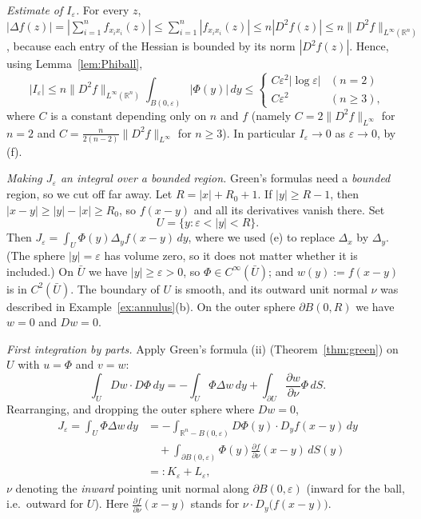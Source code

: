 \documentclass[11pt]{article}
\theoremstyle{plain}
\theoremstyle{definition}
\theoremstyle{remark}
\begin{document}
\textit{Estimate of $I_\varepsilon$.} For every $z$, $|\Delta f(z)| = \left|\sum_{i=1}^n f_{x_i x_i}(z)\right| \leq \sum_{i=1}^n |f_{x_i x_i}(z)| \leq n |D^2 f(z)| \leq n\|D^2 f\|_{L^\infty(\mathbb{R}^n)}$, because each entry of the Hessian is bounded by its norm $|D^2 f(z)|$. Hence, using Lemma~\ref{lem:Phiball},
\begin{equation}\label{eq:I}
|I_\varepsilon| \leq n\|D^2 f\|_{L^\infty(\mathbb{R}^n)} \int_{B(0,\varepsilon)} |\Phi(y)|\, dy \leq \begin{cases} C\varepsilon^2|\log\varepsilon| & (n=2) \\ C\varepsilon^2 & (n\geq 3), \end{cases}
\end{equation}
where $C$ is a constant depending only on $n$ and $f$ (namely $C = 2\|D^2f\|_{L^\infty}$ for $n = 2$ and $C = \frac{n}{2(n-2)}\|D^2 f\|_{L^\infty}$ for $n \geq 3$). In particular $I_\varepsilon \to 0$ as $\varepsilon \to 0$, by (f).

\textit{Making $J_\varepsilon$ an integral over a bounded region.} Green's formulas need a \emph{bounded} region, so we cut off far away. Let $R = |x| + R_0 + 1$. If $|y| \geq R - 1$, then $|x - y| \geq |y| - |x| \geq R_0$, so $f(x-y)$ and all its derivatives vanish there. Set
$$ U = \{ y : \varepsilon < |y| < R \}. $$
Then $J_\varepsilon = \int_U \Phi(y)\Delta_y f(x-y)\, dy$, where we used (e) to replace $\Delta_x$ by $\Delta_y$. (The sphere $|y| = \varepsilon$ has volume zero, so it does not matter whether it is included.) On $\bar U$ we have $|y| \geq \varepsilon > 0$, so $\Phi \in C^\infty(\bar U)$; and $w(y) := f(x-y)$ is in $C^2(\bar U)$. The boundary of $U$ is smooth, and its outward unit normal $\nu$ was described in Example~\ref{ex:annulus}(b). On the outer sphere $\partial B(0,R)$ we have $w = 0$ and $Dw = 0$.

\textit{First integration by parts.} Apply Green's formula (ii) (Theorem~\ref{thm:green}) on $U$ with $u = \Phi$ and $v = w$:
$$ \int_U Dw\cdot D\Phi\, dy = -\int_U \Phi\Delta w\, dy + \int_{\partial U}\frac{\partial w}{\partial\nu}\Phi\, dS. $$
Rearranging, and dropping the outer sphere where $Dw = 0$,
\begin{equation}\label{eq:KL}
\begin{aligned}
J_\varepsilon = \int_U \Phi \Delta w\, dy &= -\int_{\mathbb{R}^n - B(0,\varepsilon)} D\Phi(y)\cdot D_y f(x-y)\, dy \\
&\quad + \int_{\partial B(0,\varepsilon)} \Phi(y)\frac{\partial f}{\partial \nu}(x-y)\, dS(y) \\
&=: K_\varepsilon + L_\varepsilon,
\end{aligned}
\end{equation}
$\nu$ denoting the \emph{inward} pointing unit normal along $\partial B(0,\varepsilon)$ (inward for the ball, i.e.\ outward for $U$). Here $\frac{\partial f}{\partial\nu}(x-y)$ stands for $\nu\cdot D_y\big(f(x-y)\big)$.
\end{document}

